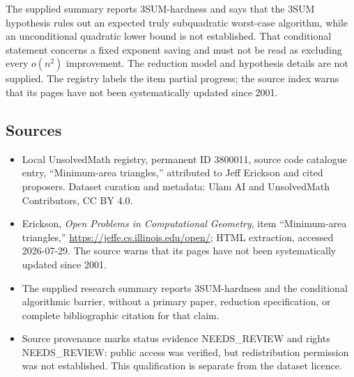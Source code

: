 \documentclass[11pt]{article}
\begin{document}
The supplied summary reports 3SUM-hardness and says that the 3SUM hypothesis rules out an expected truly subquadratic worst-case algorithm, while an unconditional quadratic lower bound is not established. That conditional statement concerns a fixed exponent saving and must not be read as excluding every $o(n^2)$ improvement. The reduction model and hypothesis details are not supplied. The registry labels the item partial progress; the source index warns that its pages have not been systematically updated since 2001.
\subsection{Sources}
\begin{itemize}
\item Local UnsolvedMath registry, permanent ID 3800011, source code catalogue entry, ``Minimum-area triangles,'' attributed to Jeff Erickson and cited proposers. Dataset curation and metadata: Ulam AI and UnsolvedMath Contributors, CC BY 4.0.
\item Erickson, \emph{Open Problems in Computational Geometry}, item ``Minimum-area triangles,'' \url{https://jeffe.cs.illinois.edu/open/}; HTML extraction, accessed 2026-07-29. The source warns that its pages have not been systematically updated since 2001.
\item The supplied research summary reports 3SUM-hardness and the conditional algorithmic barrier, without a primary paper, reduction specification, or complete bibliographic citation for that claim.
\item Source provenance marks status evidence NEEDS\_REVIEW and rights NEEDS\_REVIEW: public access was verified, but redistribution permission was not established. This qualification is separate from the dataset licence.
\end{itemize}
\end{document}
